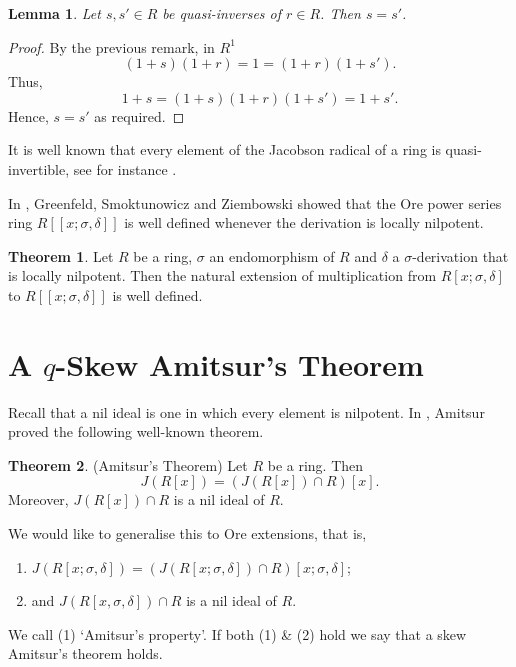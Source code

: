 \documentclass[12pt]{amsart}
\newtheorem{lem}[thm]{Lemma}
\theoremstyle{definition}
\theoremstyle{definition}
\theoremstyle{definition}
\theoremstyle{remark}
\theoremstyle{definition}
\newtheorem*{thm*}{Theorem}
\begin{document}
\begin{lem}
    \label{UniquenessofQuasiInverse}
    Let $s,s'\in R$ be quasi-inverses of $r\in R$. Then $s=s'$.
\end{lem}

\begin{proof}
    By the previous remark, in $R^1$\[
        (1+s)(1+r) = 1 = (1+r)(1+s').
    \]Thus,\[
         1+s = (1+s)(1+r)(1+s') = 1+s'.
    \]Hence, $s=s'$ as required.
\end{proof}

It is well known that every element of the Jacobson radical of a ring is quasi-invertible, see for instance \cite[Exercise 4.4]{lam1991first}.

In \cite{GreenfieldSmoktunowiczZiembowski}, Greenfeld, Smoktunowicz and Ziembowski showed that the Ore power series ring $R[[x;\sigma,\delta]]$ is well defined whenever the derivation is locally nilpotent. 

\begin{thm*} \cite[Theorem 5.3]{GreenfieldSmoktunowiczZiembowski}
\label{OrePowerSeries}
    Let $R$ be a ring, $\sigma$ an endomorphism of $R$ and $\delta$ a $\sigma$-derivation that is locally nilpotent. Then the natural extension of multiplication from $R[x;\sigma,\delta]$ to $R[[x;\sigma,\delta]]$ is well defined.
\end{thm*}


\section{A $q$-Skew Amitsur's Theorem}

Recall that a nil ideal is one in which every element is nilpotent. In \cite{Amitsur_1956}, Amitsur proved the following well-known theorem.

\begin{thm*}(Amitsur's Theorem)
\label{amitsurs}
    Let $R$ be a ring. Then $$J(R[x]) = (J(R[x])\cap R)[x].$$ Moreover, $J(R[x])\cap R$ is a nil ideal of $R$.
\end{thm*}

We would like to generalise this to Ore extensions, that is,

\begin{enumerate}
    \item $J(R[x;\sigma,\delta]) = (J(R[x;\sigma,\delta])\cap R)[x;\sigma,\delta]$;
    \item and $J(R[x,\sigma,\delta])\cap R$ is a nil ideal of $R$.
\end{enumerate}
We call (1) `Amitsur's property'. If both (1) \& (2) hold we say that a skew Amitsur's theorem holds.
\end{document}
